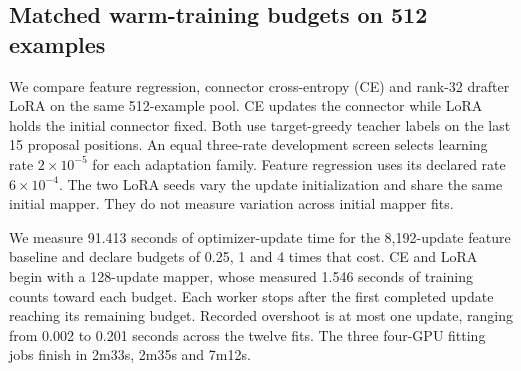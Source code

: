 \documentclass{article}
\begin{document}
\subsection{Matched warm-training budgets on 512 examples}
\label{app:timed-budget}

\begin{table}[H]
\caption{End-to-end tokens/s after matched warm-training budgets, using
one common DFlash-8B runtime and the same 512 records. Columns are nominal
training seconds. Bold marks the best tested adaptation in each column.
All twelve fits and paired intervals appear in Table~\ref{tab:timed-budget}.}
\label{tab:adaptation-main}
\centering\small

\end{table}

We compare feature regression, connector cross-entropy (CE) and rank-32
drafter LoRA on the same 512-example pool. CE updates the connector while
LoRA holds the initial connector fixed. Both use target-greedy teacher
labels on the last 15 proposal positions. An equal three-rate development
screen selects learning rate $2\times10^{-5}$ for each adaptation family.
Feature regression uses its declared rate $6\times10^{-4}$.
The two LoRA seeds vary the update initialization and share the same
initial mapper. They do not measure variation across initial mapper fits.

We measure 91.413 seconds of optimizer-update time for the 8,192-update
feature baseline and declare budgets of 0.25, 1 and 4 times that cost.
CE and LoRA begin with a 128-update mapper, whose measured 1.546 seconds
of training counts toward each budget. Each worker stops after the first
completed update reaching its remaining budget. Recorded overshoot is at
most one update, ranging from 0.002 to 0.201 seconds across the twelve fits.
The three four-GPU fitting jobs finish in 2m33s, 2m35s and 7m12s.

\begin{table}[H]
\caption{Measured training costs and subsequent decoding in one common
development campaign. Worker time includes model/cache setup, validation
and export where performed, plus the measured initial mapper worker cost
for CE and LoRA. It excludes Python startup and shared cache construction.
Ratios compare against feature regression at the same warm budget.}
\label{tab:timed-budget}
\centering\footnotesize
\setlength{\tabcolsep}{3pt}

\end{table}
\end{document}
